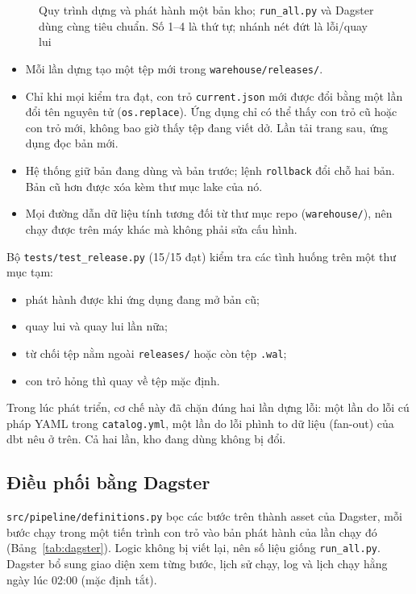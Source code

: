 \begin{figure}[htbp]
\centering
\resizebox{\textwidth}{!}{}
\caption{Quy trình dựng và phát hành một bản kho; \texttt{run\_all.py} và Dagster dùng cùng tiêu chuẩn. Số 1--4 là thứ tự; nhánh nét đứt là lỗi/quay lui}
\label{fig:release}
\end{figure}

\begin{itemize}
    \item Mỗi lần dựng tạo một tệp mới trong \texttt{warehouse/releases/}.
    \item Chỉ khi mọi kiểm tra đạt, con trỏ \texttt{current.json} mới được đổi bằng một lần đổi tên nguyên tử (\texttt{os.replace}). Ứng dụng chỉ có thể thấy con trỏ cũ hoặc con trỏ mới, không bao giờ thấy tệp đang viết dở. Lần tải trang sau, ứng dụng đọc bản mới.
    \item Hệ thống giữ bản đang dùng và bản trước; lệnh \texttt{rollback} đổi chỗ hai bản. Bản cũ hơn được xóa kèm thư mục lake của nó.
    \item Mọi đường dẫn dữ liệu tính tương đối từ thư mục repo (\texttt{warehouse/}), nên chạy được trên máy khác mà không phải sửa cấu hình.
\end{itemize}
Bộ \texttt{tests/test\_release.py} (15/15 đạt) kiểm tra các tình huống trên một thư mục tạm:
\begin{itemize}
    \item phát hành được khi ứng dụng đang mở bản cũ;
    \item quay lui và quay lui lần nữa;
    \item từ chối tệp nằm ngoài \texttt{releases/} hoặc còn tệp \texttt{.wal};
    \item con trỏ hỏng thì quay về tệp mặc định.
\end{itemize}
Trong lúc phát triển, cơ chế này đã chặn đúng hai lần dựng lỗi: một lần do lỗi cú pháp YAML trong \texttt{catalog.yml}, một lần do lỗi phình to dữ liệu (fan-out) của dbt nêu ở trên. Cả hai lần, kho đang dùng không bị đổi.

\subsection{Điều phối bằng Dagster}
\texttt{src/pipeline/definitions.py} bọc các bước trên thành asset của Dagster, mỗi bước chạy trong một tiến trình con trỏ vào bản phát hành của lần chạy đó (Bảng~\ref{tab:dagster}). Logic không bị viết lại, nên số liệu giống \texttt{run\_all.py}. Dagster bổ sung giao diện xem từng bước, lịch sử chạy, log và lịch chạy hằng ngày lúc 02:00 (mặc định tắt).


